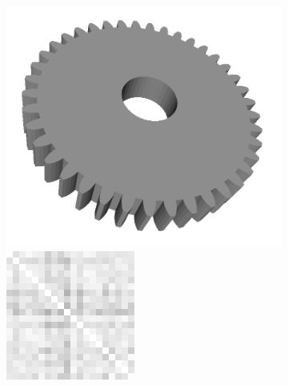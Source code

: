 \begin{figure}[ht]
	\centering
	\begin{subfigure}[b]{0.23\linewidth}
		\includegraphics[width=\linewidth]{fig/reg/cog.png} \\
		\includegraphics[width=\linewidth]{fig/reg/reg3Dtrain_cog.png} 

\end{subfigure}
\end{figure}

